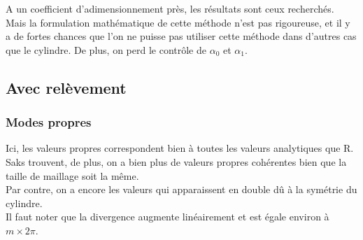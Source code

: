 A un coefficient d'adimensionnement près, les résultats sont ceux recherchés.\\

Mais la formulation mathématique de cette méthode n'est pas rigoureuse, et il y a de fortes chances que l'on ne puisse pas utiliser cette méthode dans d'autres cas que le cylindre. De plus, on perd le contrôle de $\alpha_0$ et $\alpha_1$.

\subsection{Avec relèvement}
\label{resZAR}

\subsubsection{Modes propres}

Ici, les valeurs propres correspondent bien à toutes les valeurs analytiques que R. Saks trouvent, de plus, on a bien plus de valeurs propres cohérentes bien que la taille de maillage soit la même.\\
Par contre, on a encore les valeurs qui apparaissent en double dû à la symétrie du cylindre.\\
Il faut noter que la divergence augmente linéairement et est égale environ à $m\times 2\pi$.\\

